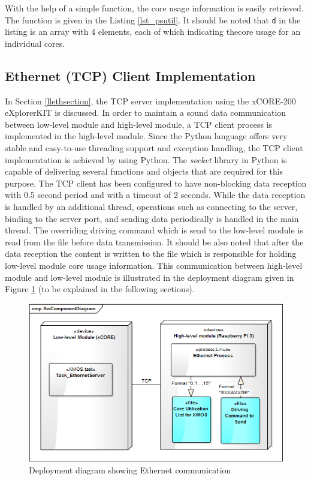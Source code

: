 With the help of a simple function, the core usage information is easily retrieved. The function is given in the Listing \ref{lst_psutil}. It should be noted that \texttt{d} in the listing is an array with 4 elements, each of which indicating thecore usage for an individual cores.
\newpage


\subsection{Ethernet (TCP) Client Implementation}
In Section \ref{llethsection}, the TCP server implementation using the xCORE-200 eXplorerKIT is discussed. In order to maintain a sound data communication between low-level module and high-level module, a TCP client process is implemented in the high-level module. Since the Python language offers very stable and easy-to-use threading support and exception handling, the TCP client implementation is achieved by using Python. The \textit{socket} library \cite{socketpython} in Python is capable of delivering several functions and objects that are required for this purpose. The TCP client has been configured to have non-blocking data reception with 0.5 second period and with a timeout of 2 seconds. While the data reception is handled by an additional thread, operations such as connecting to the server, binding to the server port, and sending data periodically is handled in the main thread. The overriding driving command which is send to the low-level module is read from the file before data transmission. It should be also noted that after the data reception the content is written to the file which is responsible for holding low-level module core usage information. This communication between high-level module and low-level module is illustrated in the deployment diagram given in Figure \ref{fig:ethernetdeployment} (to be explained in the following sections).

\begin{figure}[!ht]
	\centering
	\captionsetup{justification=centering}
	\includegraphics[scale=0.7]{content/images/ethernetdeployment.png}
	\caption{Deployment diagram showing Ethernet communication}
	\label{fig:ethernetdeployment}
\end{figure}

